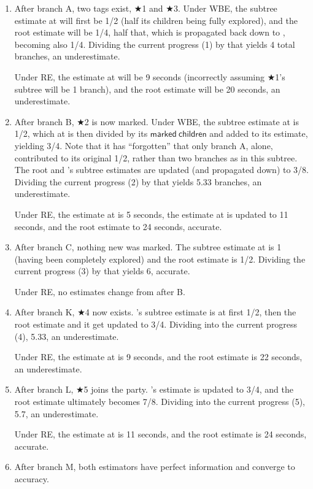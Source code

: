 \begin{enumerate}
	\item After branch A, two tags exist, $\bigstar$1 and $\bigstar$3.
		Under WBE, the subtree estimate at  will first be 1/2
		(half its children being fully explored),
		and the root estimate will be 1/4,
		half that,
		which is propagated back down to , becoming also 1/4.
		Dividing the current progress (1) by that yields 4 total branches, an underestimate.

		Under RE, the estimate at  will be 9 seconds
		(incorrectly assuming $\bigstar$1's subtree will be 1 branch),
		and the root estimate will be 20 seconds, an underestimate.
	\item After branch B, $\bigstar$2 is now marked.
		Under WBE, the subtree estimate at  is 1/2,
		which at  is then divided by its $\mathsf{marked~children}$
		and added to its estimate, yielding 3/4.
		Note that it has ``forgotten'' that only branch A, alone, contributed to its original 1/2,
		rather than two branches as in this subtree.
		The root and 's subtree estimates are updated (and propagated down) to 3/8.
		Dividing the current progress (2) by that yields 5.33 branches, an underestimate.

		Under RE, the estimate at  is 5 seconds,
		the estimate at  is updated to 11 seconds,
		and the root estimate to 24 seconds, accurate.
	\item After branch C, nothing new was marked.
		The subtree estimate at  is 1
		(having been completely explored)
		and the root estimate is 1/2.
		Dividing the current progress (3) by that yields 6, accurate.

		Under RE, no estimates change from after B.
	\item After branch K, $\bigstar$4 now exists.
		's subtree estimate is at first 1/2,
		then the root estimate and it get updated to 3/4.
		Dividing into the current progress (4), 5.33, an underestimate.

		Under RE, the estimate at  is 9 seconds,
		and the root estimate is 22 seconds, an underestimate.
	\item After branch L, $\bigstar$5 joins the party.
		's estimate is updated to 3/4,
		and the root estimate ultimately becomes 7/8.
		Dividing into the current progress (5), 5.7, an underestimate.

		Under RE, the estimate at  is 11 seconds,
		and the root estimate is 24 seconds, accurate.
	\item After branch M, both estimators have perfect information and converge to accuracy.
\end{enumerate}

